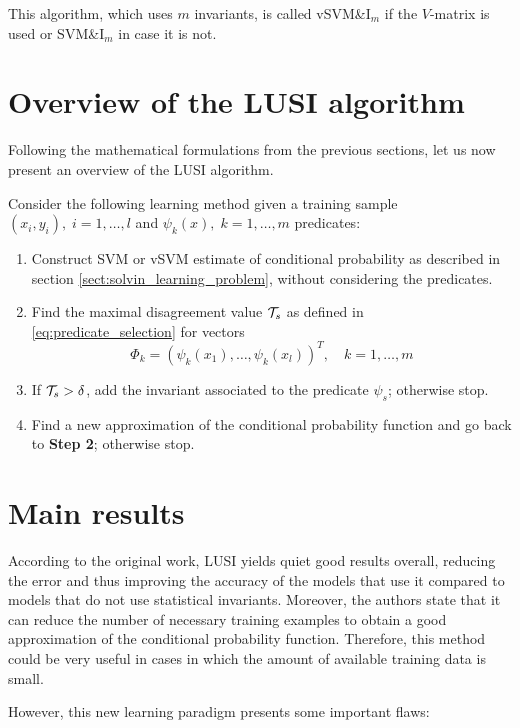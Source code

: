 This algorithm, which uses $m$ invariants, is called vSVM\&$\text{I}_m$ if the $V$-matrix is used
or SVM\&$\text{I}_m$ in case it is not.

\section{Overview of the LUSI algorithm}

Following the mathematical formulations from the previous sections, let us now present an overview of
the LUSI algorithm.

Consider the following learning method given a training sample $(x_i, y_i),\; i=1, \dots, l$ and
$\psi_k(x),\; k=1, \dots, m$ predicates:



\begin{enumerate}[label=\textbf{Step \arabic*:}]
    \item Construct SVM or vSVM estimate of conditional probability as described in section
    \ref{sect:solvin_learning_problem}, without considering the predicates.
    \item Find the maximal disagreement value $\mathcal{T}_s$ as defined in \eqref{eq:predicate_selection}
    for vectors
    \[
        \Phi_k = (\psi_k(x_1), \dots, \psi_k(x_l))^T,\quad k=1, \dots, m
    \]
    \item If $\mathcal{T}_s > \delta$, add the invariant associated to the predicate $\psi_s$; otherwise stop.
    \item Find a new approximation of the conditional probability function and go back to \textbf{Step 2};
    otherwise stop.
\end{enumerate}

\section{Main results}


According to the original work, LUSI yields quiet good results overall, reducing the error and thus improving
the accuracy of the models that use it compared to models that do not use statistical invariants. Moreover,
the authors state that it can reduce the number of necessary training examples to obtain a good approximation
of the conditional probability function. Therefore, this method could be very useful in cases in which the
amount of available training data is small.

However, this new learning paradigm presents some important flaws:

